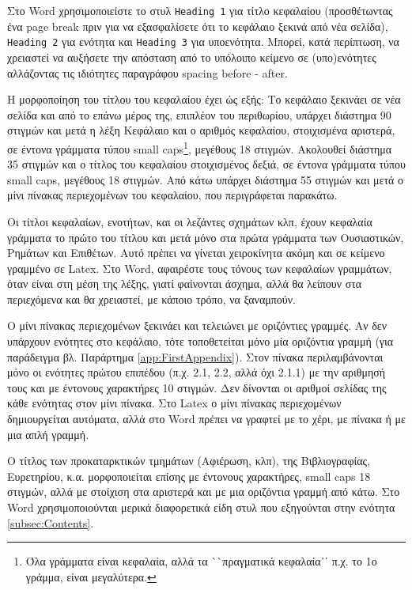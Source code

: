   Στο Word χρησιμοποιείστε το στυλ \texttt{Heading 1} για τίτλο κεφαλαίου (προσθέτωντας ένα page break πριν για να εξασφαλίσετε ότι το κεφάλαιο ξεκινά από νέα σελίδα), \texttt{Heading 2} για ενότητα και \texttt{Heading 3} για υποενότητα.
  Μπορεί, κατά περίπτωση, να χρειαστεί να αυξήσετε την απόσταση από το υπόλοιπο κείμενο σε (υπο)ενότητες αλλάζοντας τις ιδιότητες παραγράφου spacing before - after.

Η μορφοποίηση του τίτλου του κεφαλαίου έχει ώς εξής:
Το κεφάλαιο ξεκινάει σε νέα σελίδα και από το επάνω μέρος της, επιπλέον του περιθωρίου, υπάρχει διάστημα 90 στιγμών και μετά η λέξη Κεφάλαιο και ο αριθμός κεφαλαίου, στοιχισμένα αριστερά, σε έντονα γράμματα τύπου small caps\footnote{Όλα γράμματα είναι κεφαλαία, αλλά τα ``πραγματικά κεφαλαία᾽᾽ π.χ. το 1ο γράμμα, είναι μεγαλύτερα.}, μεγέθους 18 στιγμών.
Ακολουθεί διάστημα 35 στιγμών και ο τίτλος του κεφαλαίου στοιχισμένος δεξιά, σε έντονα γράμματα τύπου small caps, μεγέθους 18 στιγμών.
Από κάτω υπάρχει διάστημα 55 στιγμών και μετά ο μίνι πίνακας περιεχομένων του κεφαλαίου, που περιγράφεται παρακάτω.

Οι τίτλοι κεφαλαίων, ενοτήτων, και οι λεζάντες σχημάτων κλπ, έχουν κεφαλαία γράμματα το πρώτο του τίτλου και μετά μόνο στα πρώτα γράμματα των Ουσιαστικών, Ρημάτων και Επιθέτων.
Αυτό πρέπει να γίνεται χειροκίνητα ακόμη και σε κείμενο γραμμένο σε Latex.
Στο Word, αφαιρέστε τους τόνους των κεφαλαίων γραμμάτων, όταν είναι στη μέση της λέξης, γιατί φαίνονται άσχημα, αλλά θα λείπουν στα περιεχόμενα και θα χρειαστεί, με κάποιο τρόπο, να ξαναμπούν.

Ο μίνι πίνακας περιεχομένων ξεκινάει και τελειώνει με οριζόντιες γραμμές.
Αν δεν υπάρχουν ενότητες στο κεφάλαιο, τότε τοποθετείται μόνο μία οριζόντια γραμμή (για παράδειγμα βλ. Παράρτημα \ref{app:FirstAppendix}).
Στον πίνακα περιλαμβάνονται μόνο οι ενότητες πρώτου επιπέδου (π.χ. 2.1, 2.2, αλλά όχι 2.1.1) με την αριθμησή τους και με έντονους χαρακτήρες 10 στιγμών.
Δεν δίνονται οι αριθμοί σελίδας της κάθε ενότητας στον μίνι πίνακα.
Στο Latex ο μίνι πίνακας περιεχομένων δημιουργείται αυτόματα, αλλά στο Word πρέπει να γραφτεί με το χέρι, με πίνακα ή με μια απλή γραμμή.

Ο τίτλος των προκαταρκτικών τμημάτων (Αφιέρωση, κλπ), της Βιβλιογραφίας, Ευρετηρίου, κ.α. μορφοποιείται επίσης με έντονους χαρακτήρες, small caps 18 στιγμών,  αλλά με στοίχιση στα αριστερά και με μια οριζόντια γραμμή από κάτω.
Στο Word χρησιμοποιούνται μερικά διαφορετικά είδη στυλ που εξηγούνται στην ενότητα \ref{subsec:Contents}.


